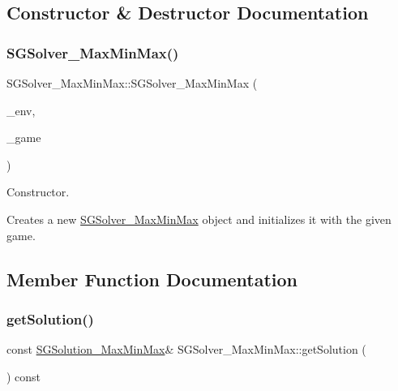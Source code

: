 \subsection{Constructor \& Destructor Documentation}
\mbox{\label{classSGSolver__MaxMinMax_a840cb488bc710b26bfc458417bd5dc2d}} 
\subsubsection{\texorpdfstring{S\+G\+Solver\+\_\+\+Max\+Min\+Max()}{SGSolver\_MaxMinMax()}}
{\footnotesize\ttfamily S\+G\+Solver\+\_\+\+Max\+Min\+Max\+::\+S\+G\+Solver\+\_\+\+Max\+Min\+Max (\begin{DoxyParamCaption}\item[{const \hyperlink{classSGEnv}{S\+G\+Env} \&}]{\+\_\+env,  }\item[{const \hyperlink{classSGGame}{S\+G\+Game} \&}]{\+\_\+game }\end{DoxyParamCaption})}



Constructor. 

Creates a new \hyperlink{classSGSolver__MaxMinMax}{S\+G\+Solver\+\_\+\+Max\+Min\+Max} object and initializes it with the given game. 

\subsection{Member Function Documentation}
\mbox{\label{classSGSolver__MaxMinMax_ab8475d7043987a535dcadf3db3044aba}} 
\subsubsection{\texorpdfstring{get\+Solution()}{getSolution()}}
{\footnotesize\ttfamily const \hyperlink{classSGSolution__MaxMinMax}{S\+G\+Solution\+\_\+\+Max\+Min\+Max}\& S\+G\+Solver\+\_\+\+Max\+Min\+Max\+::get\+Solution (\begin{DoxyParamCaption}{ }\end{DoxyParamCaption}) const\hspace{0.3cm}{\ttfamily [inline]}}

